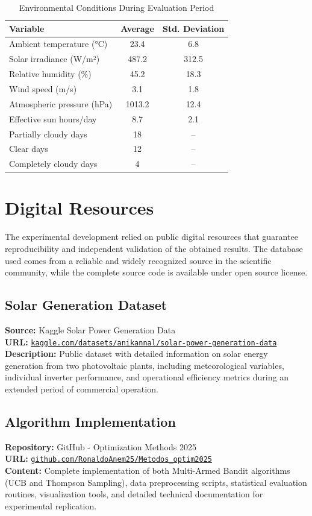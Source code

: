 \documentclass[conference]{IEEEtran}
\begin{document}
\begin{table}[H]
\centering
\caption{Environmental Conditions During Evaluation Period}
\label{tab:environmental}
\begin{tabular}{lcc}
\toprule
\textbf{Variable} & \textbf{Average} & \textbf{Std. Deviation} \\
\midrule
Ambient temperature (°C) & 23.4 & 6.8 \\
Solar irradiance (W/m²) & 487.2 & 312.5 \\
Relative humidity (\%) & 45.2 & 18.3 \\
Wind speed (m/s) & 3.1 & 1.8 \\
Atmospheric pressure (hPa) & 1013.2 & 12.4 \\
Effective sun hours/day & 8.7 & 2.1 \\
Partially cloudy days & 18 & -- \\
Clear days & 12 & -- \\
Completely cloudy days & 4 & -- \\
\bottomrule
\end{tabular}
\end{table}

\section{Digital Resources}

The experimental development relied on public digital resources that guarantee reproducibility and independent validation of the obtained results. The database used comes from a reliable and widely recognized source in the scientific community, while the complete source code is available under open source license.

\subsection{Solar Generation Dataset}
\textbf{Source:} Kaggle Solar Power Generation Data\\
\textbf{URL:} \href{https://acortar.link/rS9PxU}{\texttt{kaggle.com/datasets/anikannal/solar-power-generation-data}}\\
\textbf{Description:} Public dataset with detailed information on solar energy generation from two photovoltaic plants, including meteorological variables, individual inverter performance, and operational efficiency metrics during an extended period of commercial operation.

\subsection{Algorithm Implementation}
\textbf{Repository:} GitHub - Optimization Methods 2025\\
\textbf{URL:} \href{https://acortar.link/HgyuN6}{\texttt{github.com/RonaldoAnem25/Metodos\_optim2025}}\\
\textbf{Content:} Complete implementation of both Multi-Armed Bandit algorithms (UCB and Thompson Sampling), data preprocessing scripts, statistical evaluation routines, visualization tools, and detailed technical documentation for experimental replication.
\end{document}
